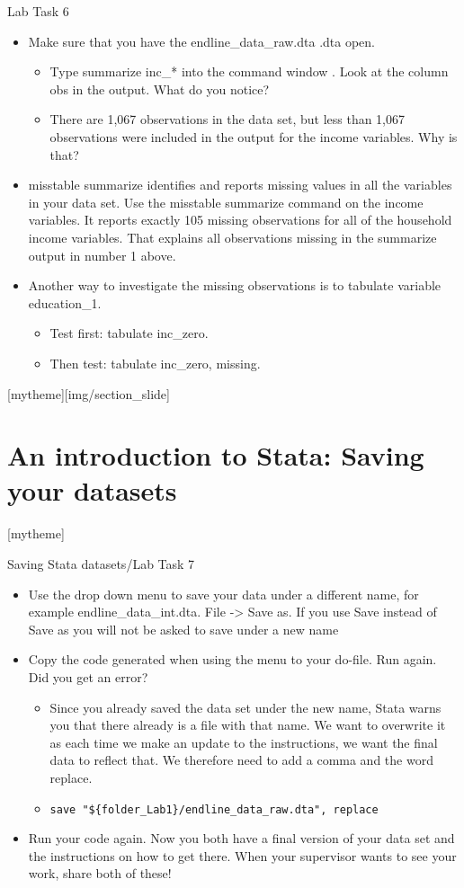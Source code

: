 \documentclass[aspectratio=169]{beamer}
\newcommand{\sectionpic}[2]{
	\setbeamertemplate{section page}[mytheme][#2]
	\section{#1}
	\setbeamertemplate{section page}[mytheme]
}
\begin{document}
\begin{frame}{Lab Task 6}
\begin{itemize}
	\item Make sure that you have the endline\_data\_raw.dta .dta open.
		\begin{itemize}
			\item Type summarize inc\_* into the command window . Look at the column obs in the output. What do you notice?
			\item There are  1,067 observations in the data set, but less than 1,067 observations were included in the output for the income variables. Why is that? 		
		\end{itemize}
	\item misstable summarize identifies and reports missing values in all the variables in your data set. Use the misstable summarize command on the income variables. It reports exactly 105 missing observations for all of the household income variables. That explains all observations missing in the summarize output in number 1 above.
	\item Another way to investigate the missing observations is to tabulate variable education\_1.
		\begin{itemize}
			\item Test first: tabulate inc\_zero.
			\item Then test: tabulate inc\_zero, missing.
		\end{itemize}	 
\end{itemize}
\end{frame}

\sectionpic{An introduction to Stata: \newline Saving your datasets}{img/section_slide}

\begin{frame}{Saving Stata datasets/Lab Task 7}
\begin{itemize}
	\item Use the drop down menu to save your data under a different name, for example endline\_data\_int.dta. File -> Save as. If you use Save instead of Save as you will not be asked to save under a new name
	\item Copy the code generated when using the menu to your do-file. Run again. Did you get an error?
		\begin{itemize}
			\item Since you already saved the data set under the new name, Stata warns you that there already is a file with that name. We want to overwrite it as each time we make an update to the instructions, we want the final data to reflect that. We therefore need to add a comma and the word replace. 
			\item \texttt{save "\$\{folder\_Lab1\}/endline\_data\_raw.dta", replace}
		\end{itemize}
	\item Run your code again. Now you both have a final version of your data set and the instructions on how to get there. When your supervisor wants to see your work, share both of these! 
\end{itemize}
\end{frame}
\end{document}
